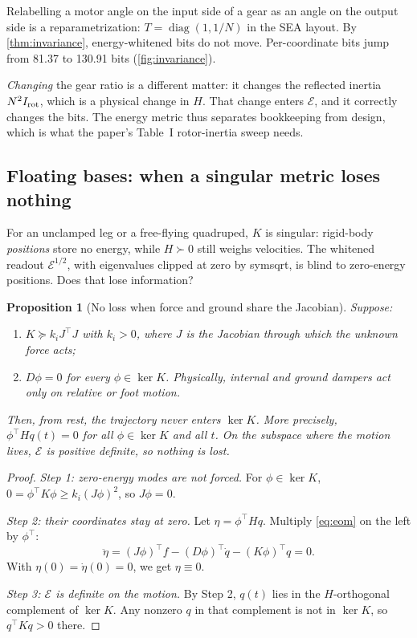 \documentclass[11pt]{article}
\newtheorem{proposition}[theorem]{Proposition}
\theoremstyle{definition}
\theoremstyle{remark}
\newcommand{\diag}{\operatorname{diag}}
\newcommand{\Em}{\mathcal{E}}         %
\newcommand{\codeus}{\textunderscore\allowbreak}
\newcommand{\code}[1]{{\ttfamily\let\_\codeus\hyphenchar\font=-1 #1}}
\begin{document}
Relabelling a motor angle on the input side of a gear as an angle on the output side is a
reparametrization: $T=\diag(1,1/N)$ in the SEA layout. By \cref{thm:invariance},
energy-whitened bits do not move. Per-coordinate bits jump from 81.37 to 130.91 bits
(\cref{fig:invariance}).

\emph{Changing} the gear ratio is a different matter: it changes the reflected inertia
$N^2I_{\rm rot}$, which is a physical change in $H$. That change enters $\Em$, and it
correctly changes the bits. The energy metric thus separates bookkeeping from design,
which is what the paper's Table~I rotor-inertia sweep needs.

\subsection{Floating bases: when a singular metric loses nothing}
\label{sec:floating}

For an unclamped leg or a free-flying quadruped, $K$ is singular: rigid-body
\emph{positions} store no energy, while $H\succ0$ still weighs velocities. The
whitened readout $\Em^{1/2}$, with eigenvalues clipped at zero by \code{sym\_sqrt}, is
blind to zero-energy positions. Does that lose information?

\begin{proposition}[No loss when force and ground share the Jacobian]\label{prop:floating}
Suppose:
\begin{enumerate}[label=(\roman*),nosep]
  \item $K\succeq k_iJ^\top J$ with $k_i>0$, where $J$ is the Jacobian through which the
        unknown force acts;
  \item $D\phi=0$ for every $\phi\in\ker K$. Physically, internal and ground dampers act
        only on relative or foot motion.
\end{enumerate}
Then, from rest, the trajectory never enters $\ker K$. More precisely, $\phi^\top Hq(t)=0$
for all $\phi\in\ker K$ and all $t$. On the subspace where the motion lives, $\Em$ is
positive definite, so nothing is lost.
\end{proposition}
\begin{proof}
\emph{Step 1: zero-energy modes are not forced.} For $\phi\in\ker K$,
$0=\phi^\top K\phi\ge k_i(J\phi)^2$, so $J\phi=0$.

\emph{Step 2: their coordinates stay at zero.} Let $\eta=\phi^\top Hq$. Multiply
\eqref{eq:eom} on the left by $\phi^\top$:
\[
  \ddot\eta=(J\phi)^\top f-(D\phi)^\top\dot q-(K\phi)^\top q=0 .
\]
With $\eta(0)=\dot\eta(0)=0$, we get $\eta\equiv0$.

\emph{Step 3: $\Em$ is definite on the motion.} By Step 2, $q(t)$ lies in the
$H$-orthogonal complement of $\ker K$. Any nonzero $q$ in that complement is not in
$\ker K$, so $q^\top Kq>0$ there.
\end{proof}
\end{document}
